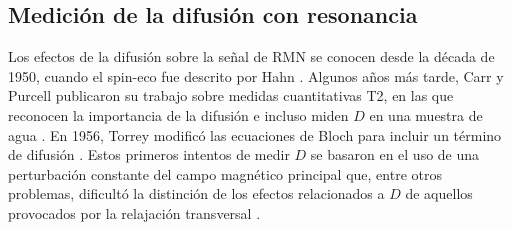 \subsection{Medición de la difusión con resonancia}

Los efectos de la difusión sobre la señal de RMN se conocen desde la década de 1950, cuando el spin-eco fue descrito por Hahn \cite{Hahn_1950}. Algunos años más tarde, Carr y Purcell publicaron su trabajo sobre medidas cuantitativas T2, en las que reconocen la importancia de la difusión e incluso miden $D$ en una muestra de agua \cite{Carr_1954}. En 1956, Torrey modificó las ecuaciones de Bloch para incluir un término de difusión \cite{Torrey_1956}. Estos primeros intentos de medir $D$ se basaron en el uso de una perturbación constante del campo magnético principal que, entre otros problemas, dificultó la distinción de los efectos relacionados a $D$ de aquellos provocados por la relajación transversal \Ttwo.

